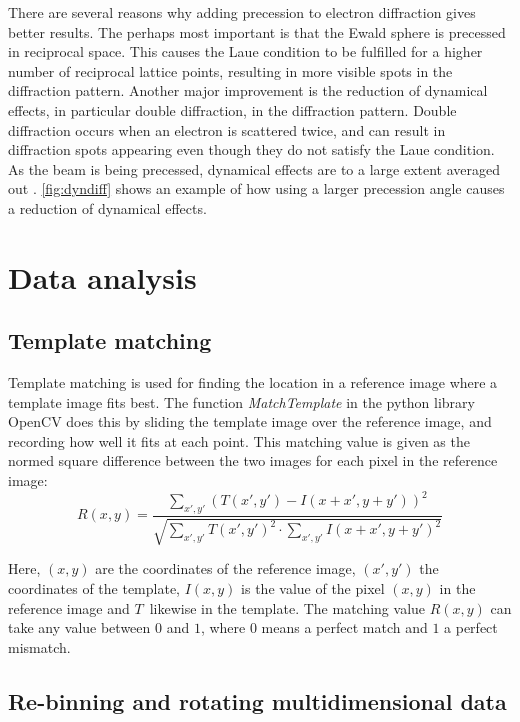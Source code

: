 There are several reasons why adding precession to electron diffraction gives better results. The perhaps most important is that the Ewald sphere is precessed in reciprocal space. This causes the Laue condition to be fulfilled for a higher number of reciprocal lattice points, resulting in more visible spots in the diffraction pattern. Another major improvement is the reduction of dynamical effects, in particular double diffraction, in the diffraction pattern. Double diffraction occurs when an electron is scattered twice, and can result in diffraction spots appearing even though they do not satisfy the Laue condition. As the beam is being precessed, dynamical effects are to a large extent averaged out \cite{williams-carter, sped-thesis}. \cref{fig:dyndiff} shows an example of how using a larger precession angle causes a reduction of dynamical effects.


\section{Data analysis}
	\subsection{Template matching}
	\label{sec:theory/template-matching}
Template matching is used for finding the location in a reference image where a template image fits best. The function \textit{MatchTemplate} in the python library OpenCV does this by sliding the template image over the reference image, and recording how well it fits at each point. This matching value is given as the normed square difference between the two images for each pixel in the reference image:
\begin{equation}
 R(x,y)= \frac{\sum_{x',y'} (T(x',y')-I(x+x',y+y'))^2}{\sqrt{\sum_{x',y'}T(x',y')^2 \cdot \sum_{x',y'} I(x+x',y+y')^2}}
 \label{eq:matching value}
\end{equation}

Here, $(x,y)$ are the coordinates of the reference image, $(x',y')$ the coordinates of the template, $I(x,y)$ is the value of the pixel $(x,y)$ in the reference image and $T$ likewise in the template. The matching value $R(x,y)$ can take any value between $0$ and $1$, where $0$ means a perfect match and $1$ a perfect mismatch.

	\subsection{Re-binning and rotating multidimensional data}
	\label{sec:rebin-rotate}
	
